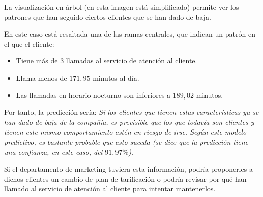 \documentclass[a4paper, 11pt]{article} %
\begin{document}
\begin{shaded}
La visualización en árbol (en esta imagen está simplificado) permite ver los patrones que han seguido ciertos clientes que se han dado de baja.

En este caso está resaltada una de las ramas centrales, que indican un patrón en el que el cliente:
\begin{itemize}
    \item Tiene más de $3$ llamadas al servicio de atención al cliente.
    \item Llama menos de $171,95$ minutos al día.
    \item Las llamadas en horario nocturno son inferiores a $189,02$ minutos.
\end{itemize}

Por tanto, la predicción sería: \textit{Si los clientes que tienen estas características ya se han dado de baja de la compañía, es previsible que los que todavía son clientes y tienen este mismo comportamiento estén en riesgo de irse. Según este modelo predictivo, es bastante probable que esto suceda (se dice que la predicción tiene una confianza, en este caso, del $91,97\%$).}

Si el departamento de marketing tuviera esta información, podría proponerles a dichos clientes un cambio de plan de tarificación o podría revisar por qué han llamado al servicio de atención al cliente para intentar mantenerlos.
\end{shaded}
\end{document}
